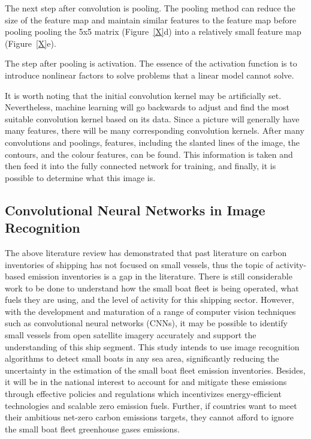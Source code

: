The next step after convolution is pooling. The pooling method can reduce the size of the feature map and maintain similar features to the feature map before pooling pooling the 5x5 matrix (Figure~\ref{X}d) into a relatively small feature map (Figure~\ref{X}e).


The step after pooling is activation. The essence of the activation function is to introduce nonlinear factors to solve problems that a linear model cannot solve.

It is worth noting that the initial convolution kernel may be artificially set. Nevertheless, machine learning will go backwards to adjust and find the most suitable convolution kernel based on its data. Since a picture will generally have many features, there will be many corresponding convolution kernels. After many convolutions and poolings, features, including the slanted lines of the image, the contours, and the colour features, can be found. This information is taken and then feed it into the fully connected network for training, and finally, it is possible to determine what this image is.


\subsection{Convolutional Neural Networks in Image Recognition}
\label{sec2.2}
The above literature review has demonstrated that past literature on carbon inventories of shipping has not focused on small vessels, thus the topic of activity-based emission inventories is a gap in the literature. There is still considerable work to be done to understand how the small boat fleet is being operated, what fuels they are using, and the level of activity for this shipping sector. However, with the development and maturation of a range of computer vision techniques such as convolutional neural networks (CNNs), it may be possible to identify small vessels from open satellite imagery accurately and support the understanding of this ship segment. This study intends to use image recognition algorithms to detect small boats in any sea area, significantly reducing the uncertainty in the estimation of the small boat fleet emission inventories. Besides, it will be in the national interest to account for and mitigate these emissions through effective policies and regulations which incentivizes energy-efficient technologies and scalable zero emission fuels. Further, if countries want to meet their ambitious net-zero carbon emissions targets, they cannot afford to ignore the small boat fleet greenhouse gases emissions.

